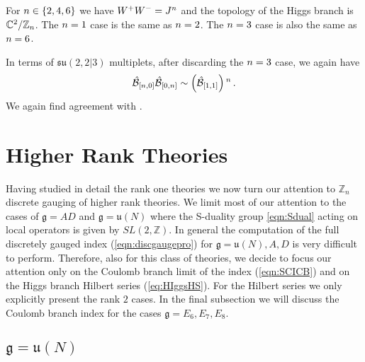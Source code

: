 \documentclass[main.tex]{subfiles}
\begin{document}
For ${n}\in\{2,4,6\}$ we have $W^+W^-=J^{n}$ and the topology of the Higgs branch is $\mathbb{C}^2/\mathbb{Z}_{n}$. The ${n}=1$ case is the same as ${n}=2$. The ${n}=3$ case is also the same as ${n}=6$. 
\begin{comment}
Moreover, it is important to note that the $\kgg=3$ case cannot be obtained from the usual $\mathcal{N}=4$ theories since, when one considers non-local operators, the S-duality group is reduced to a subgroup of $SL(2,\mathbb{Z})$ , however it is only physical for discrete gauging of the `new' $\mathcal{N}=4$ theory \cite{Argyres:2016yzz} and the exact interpretation therefore of the ${\kgg}=3$ discrete gauging is still somewhat unclear. 
\end{comment}
In terms of $\mathfrak{su}(2,2|3)$ multiplets, after discarding the ${n}=3$ case, we again have
\begin{equation}
\hat{\mathcal{B}}_{[{n},0]}\hat{\mathcal{B}}_{[0,{n}]}\color{black}\sim\left(\hat{\mathcal{B}}_{[1,1]}\color{black}\right)^{n}\,.
\end{equation}
We again find agreement with \cite{Nishinaka:2016hbw,Lemos:2016xke}.

\section{Higher Rank Theories}\label{sec:rankN}\renewcommand{\arraystretch}{1.2}
Having studied in detail the rank one theories we now turn our attention to $\mathbb{Z}_n$ discrete gauging of higher rank theories. We limit most of our attention to the cases of $\mathfrak{g}=AD$ and $\mathfrak{g}=\mathfrak{u}(N)$ where the S-duality group \eqref{eqn:Sdual} acting on local operators is given by $SL(2,\mathbb{Z})$. In general the computation of the full discretely gauged index (\ref{eqn:discgaugepro}) for  $\mathfrak{g}=\mathfrak{u}(N),A,D$ is very difficult to perform. Therefore, also for this class of theories, we decide to focus our attention only on the Coulomb branch limit of the index (\ref{eqn:SCICB}) and on the Higgs branch Hilbert series (\ref{eq:HIggsHS}). For the Hilbert series we only explicitly present the rank $2$ cases. In the final subsection we will discuss the Coulomb branch index for the cases $\mathfrak{g}=E_6,E_7,E_8$. 
\subsection{\texorpdfstring{$\mathfrak{g}=\mathfrak{u}(N)$}{g=u(N)}} 
\end{document}
